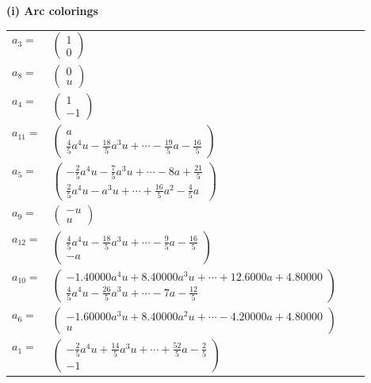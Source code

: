 \documentclass[1p]{elsarticle_modified}
\theoremstyle{definition}
\begin{document}
\flushleft \textbf{(i) Arc colorings}\\
\begin{tabular}{m{7pt} m{180pt} m{7pt} m{180pt} }
\flushright $a_{3}=$&$\begin{pmatrix}1\\0\end{pmatrix}$ \\
\flushright $a_{8}=$&$\begin{pmatrix}0\\u\end{pmatrix}$ \\
\flushright $a_{4}=$&$\begin{pmatrix}1\\-1\end{pmatrix}$ \\
\flushright $a_{11}=$&$\begin{pmatrix}a\\\frac{4}{5} a^4 u-\frac{18}{5} a^3 u+\cdots-\frac{19}{5} a-\frac{16}{5}\end{pmatrix}$ \\
\flushright $a_{5}=$&$\begin{pmatrix}-\frac{2}{5} a^4 u-\frac{7}{5} a^3 u+\cdots-8 a+\frac{21}{5}\\\frac{2}{5} a^4 u- a^3 u+\cdots+\frac{16}{5} a^2-\frac{4}{5} a\end{pmatrix}$ \\
\flushright $a_{9}=$&$\begin{pmatrix}- u\\u\end{pmatrix}$ \\
\flushright $a_{12}=$&$\begin{pmatrix}\frac{4}{5} a^4 u-\frac{18}{5} a^3 u+\cdots-\frac{9}{5} a-\frac{16}{5}\\- a\end{pmatrix}$ \\
\flushright $a_{10}=$&$\begin{pmatrix}-1.40000 a^{4} u+8.40000 a^{3} u+\cdots+12.6000 a+4.80000\\\frac{4}{5} a^4 u-\frac{26}{5} a^3 u+\cdots-7 a-\frac{12}{5}\end{pmatrix}$ \\
\flushright $a_{6}=$&$\begin{pmatrix}-1.60000 a^{3} u+8.40000 a^{2} u+\cdots-4.20000 a+4.80000\\u\end{pmatrix}$ \\
\flushright $a_{1}=$&$\begin{pmatrix}-\frac{2}{5} a^4 u+\frac{14}{5} a^3 u+\cdots+\frac{52}{5} a-\frac{2}{5}\\-1\end{pmatrix}$ \\

\end{tabular}
\end{document}
